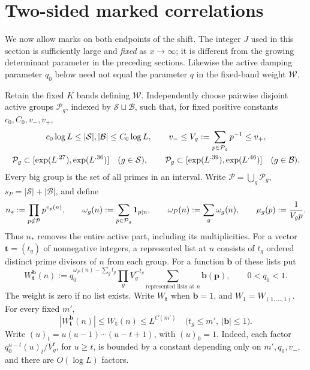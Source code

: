 \section{Two-sided marked correlations}\label{sec:correlations}
\label{cor:section}

We now allow marks on both endpoints of the shift.  The integer $J$ used
in this section is sufficiently large and \emph{fixed} as $x\to\infty$;
it is different from the growing determinant parameter in the preceding
sections.  Likewise the active damping parameter $q_0$ below need not
equal the parameter $q$ in the fixed-band weight $\mathcal W$.

Retain the fixed $K$ bands defining $\mathcal W$.  Independently choose
pairwise disjoint active groups $\mathcal P_g$, indexed by
$\mathcal S\sqcup\mathcal B$, such that, for fixed positive constants
$c_0,C_0,v_-,v_+$,
\begin{gather}
 c_0\log L\leq |\mathcal S|,|\mathcal B|\leq C_0\log L,
 \qquad v_-\leq V_g:=\sum_{p\in\mathcal P_g}p^{-1}\leq v_+,
 \label{cor:groups}\\
 \mathcal P_g\subset[\exp(L^{.27}),\exp(L^{.36})]
       \quad(g\in\mathcal S),\qquad
 \mathcal P_g\subset[\exp(L^{.39}),\exp(L^{.46})]
       \quad(g\in\mathcal B).\notag
\end{gather}
Every big group is the set of all primes in an interval.  Write
$\mathcal P=\bigcup_g\mathcal P_g$, $s_P=|\mathcal S|+|\mathcal B|$,
and define
\[
 n_*:=\prod_{p\notin\mathcal P}p^{v_p(n)},\qquad
 \omega_g(n):=\sum_{p\in\mathcal P_g}\mathbf{1}_{p\mid n},\qquad
 \omega_P(n):=\sum_g\omega_g(n),\qquad
 \mu_g(p):=\frac1{V_gp}.
\]
Thus $n_*$ removes the entire active part, including its multiplicities.
For a vector $\mathbf t=(t_g)$ of nonnegative integers, a represented
list at $n$ consists of $t_g$ ordered distinct prime divisors of $n$
from each group.  For a function $\mathbf b$ of these lists put
\begin{equation}\label{cor:marked-weight}
 W_{\mathbf t}^{\mathbf b}(n)
  :=q_0^{\omega_P(n)-\sum_g t_g}
       \prod_gV_g^{-t_g}
       \sum_{\text{represented lists at }n}\mathbf b(\mathbf p),
 \qquad 0<q_0<1.
\end{equation}
The weight is zero if no list exists.  Write $W_{\mathbf t}$ when
$\mathbf b=1$, and $W_1=W_{(1,\ldots,1)}$.  For every fixed $m'$,
\begin{equation}\label{cor:marked-bound}
 |W_{\mathbf t}^{\mathbf b}(n)|\leq W_{\mathbf t}(n)
 \leq L^{C(m')}
 \quad\bigl(t_g\leq m',\ |\mathbf b|\leq1\bigr).
\end{equation}
Write $(u)_t=u(u-1)\cdots(u-t+1)$, with $(u)_0=1$.
Indeed, each factor
$q_0^{u-t}(u)_t/V_g^t$, for $u\geq t$, is bounded by a constant
depending only on $m',q_0,v_-$, and there are $O(\log L)$ factors.

